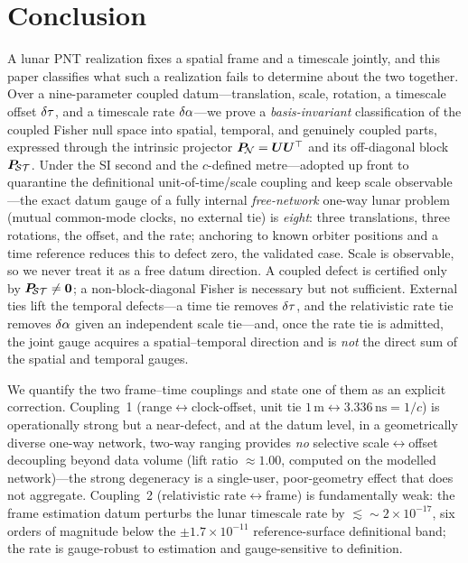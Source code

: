 \section{Conclusion}
\label{sec:conclusion}

A lunar PNT realization fixes a spatial frame and a timescale jointly, and this paper
classifies what such a realization fails to determine about the two together. Over a
nine-parameter coupled datum---translation, scale, rotation, a timescale offset $\delta\tau$, and
a timescale rate $\delta\alpha$---we prove a \emph{basis-invariant} classification of the coupled
Fisher null space into spatial, temporal, and genuinely coupled parts, expressed through the
intrinsic projector $\bm{P}_{\!\mathcal{N}}=\bm{U}\bm{U}^\top$ and its off-diagonal block $\bm{P}_{\!\mathcal{S}\mathcal{T}}$. Under the SI
second and the $c$-defined metre---adopted up front to quarantine the definitional
unit-of-time/scale coupling and keep scale observable---the exact datum gauge of a fully
internal \emph{free-network} one-way lunar problem (mutual common-mode clocks, no external
tie) is \emph{eight}: three translations, three rotations, the offset, and the rate;
anchoring to known orbiter positions and a time reference reduces this to defect zero, the
validated case. Scale is observable, so we never treat it as a free datum direction. A
coupled defect is certified only by $\bm{P}_{\!\mathcal{S}\mathcal{T}}\neq\bm0$; a non-block-diagonal Fisher is necessary
but not sufficient. External ties lift the temporal defects---a time tie removes $\delta\tau$, and
the relativistic rate tie removes $\delta\alpha$ given an independent scale tie---and, once the
rate tie is admitted, the joint gauge acquires a spatial--temporal direction and is
\emph{not} the direct sum of the spatial and temporal gauges.

We quantify the two frame--time couplings and state one of them as an explicit correction.
Coupling~1 (range$\leftrightarrow$clock-offset, unit tie
$1\,\text{m}\leftrightarrow3.336\,\text{ns}=1/c$) is operationally strong but a near-defect,
and at the datum level, in a geometrically diverse one-way network, two-way ranging provides
\emph{no} selective scale$\leftrightarrow$offset decoupling beyond data volume (lift ratio
$\approx1.00$, computed on the modelled network)---the strong degeneracy is a single-user,
poor-geometry effect that does not aggregate. Coupling~2 (relativistic rate$\leftrightarrow$frame) is fundamentally weak: the
frame estimation datum perturbs the lunar timescale rate by $\lesssim\!\sim\!2\times10^{-17}$,
six orders of magnitude below the $\pm1.7\times10^{-11}$ reference-surface definitional band;
the rate is gauge-robust to estimation and gauge-sensitive to definition.

